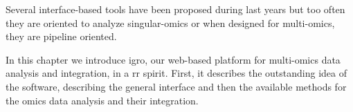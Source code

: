 Several interface-based tools \cite{Poplawski2016} have been proposed during last years but too often they are oriented to analyze singular-omics or when designed for multi-omics, they are pipeline oriented. 

In this chapter we introduce \gls{igro}, our web-based platform for multi-omics data analysis and integration,  in a \gls{rr} spirit.
First, it describes the outstanding idea of the software, describing the general interface and then the available methods for the omics data analysis and their integration.


%
%
%
%



